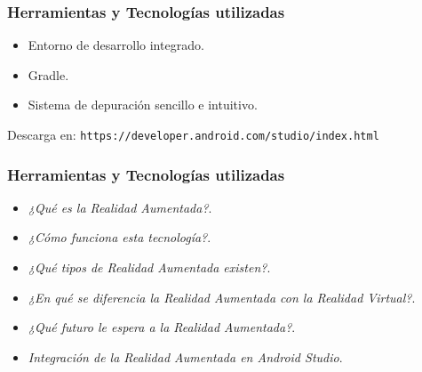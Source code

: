 \begin{frame}
	\frametitle{Herramientas y Tecnologías utilizadas}
		\begin{itemize}
			\item Entorno de desarrollo integrado.
			\item Gradle.
			\item Sistema de depuración sencillo e intuitivo.
		\end{itemize}
		Descarga en: \texttt{https://developer.android.com/studio/index.html}
	\endblock{}
\end{frame}

\begin{frame}
	\frametitle{Herramientas y Tecnologías utilizadas}
		\begin{itemize}
			\item {\it ¿Qué es la Realidad Aumentada?}.
			\item {\it ¿Cómo funciona esta tecnología?}.
			\item {\it ¿Qué tipos de Realidad Aumentada existen?}.
			\item {\it ¿En qué se diferencia la Realidad Aumentada con la Realidad Virtual?}.
			\item {\it ¿Qué futuro le espera a la Realidad Aumentada?}.
			\item {\it Integración de la Realidad Aumentada en Android Studio}.
		\end{itemize}
	\endblock{}
\end{frame}



